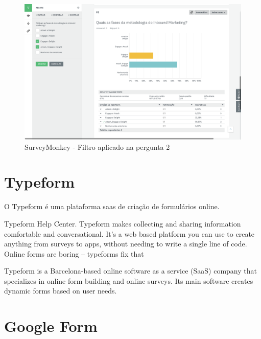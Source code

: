 \begin{figure}[ht!]
\begin{center}
	\includegraphics[width=1\textwidth]{img/surveymonkey-form-filtro1}
	\caption{SurveyMonkey - Filtro aplicado na pergunta 2 }
	\label{fig:surveymonkey-form-filtro1}
\end{center}
\end{figure}

\section{Typeform}
\label{typeform}

O Typeform é uma plataforma \acrshort{saas} de criação de formulários online.



Typeform Help Center. Typeform makes collecting and sharing information comfortable and conversational. It's a web based platform you can use to create anything from surveys to apps, without needing to write a single line of code. Online forms are boring – typeforms fix that

Typeform is a Barcelona-based online software as a service (SaaS) company that specializes in online form building and online surveys. Its main software creates dynamic forms based on user needs.


\section{Google Form}
\label{googleform}
\blankpage

\glsresetall



